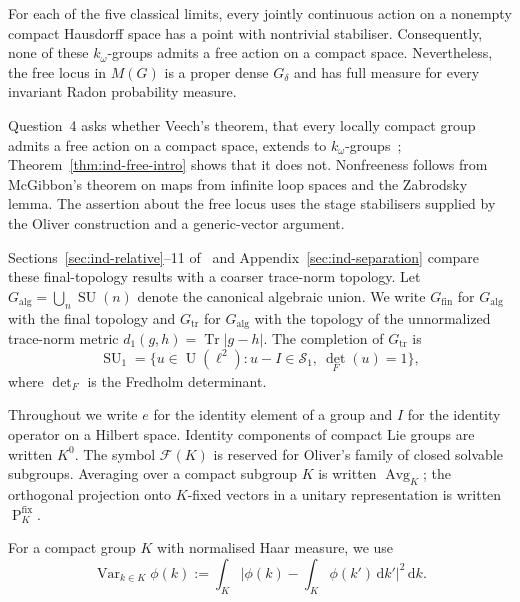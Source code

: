 \begin{theorem}\label{thm:ind-free-intro}
For each of the five classical limits, every jointly continuous action
on a nonempty compact Hausdorff space has a point with nontrivial
stabiliser. Consequently, none of these $k_\omega$-groups admits a free
action on a compact space. Nevertheless, the free locus in $M(G)$ is a
proper dense $G_\delta$ and has full measure for every invariant Radon
probability measure.
\end{theorem}

Question~4 asks whether Veech's theorem, that every locally compact
group admits a free action on a compact space, extends to
$k_\omega$-groups~\cite[p.~440]{Pestov2007};
Theorem~\ref{thm:ind-free-intro} shows that it does not.
Nonfreeness follows from McGibbon's theorem on maps from infinite
loop spaces and the Zabrodsky lemma. The assertion about the free
locus uses the stage stabilisers supplied by the Oliver construction
and a generic-vector argument.

Sections~\ref{sec:ind-relative}--11 of~\cite{LupiniInductive2026} and
Appendix~\ref{sec:ind-separation} compare these final-topology results with
a coarser trace-norm topology. Let
$G_{\mathrm{alg}}=\bigcup_n\operatorname{SU}(n)$ denote the canonical algebraic union. We write
$G_{\mathrm{fin}}$ for $G_{\mathrm{alg}}$ with the final topology and $G_{\mathrm{tr}}$ for
$G_{\mathrm{alg}}$ with the topology of the unnormalized trace-norm metric
$d_1(g,h)=\operatorname{Tr}\lvert g-h\rvert$. The completion of $G_{\mathrm{tr}}$ is
\begin{equation}\label{eq:ind-suone}
\operatorname{SU}_1=\{u\in\operatorname{U}(\ell^2):u-I\in\mathcal S_1,\ \det_F(u)=1\},
\end{equation}
where $\det_F$ is the Fredholm determinant.

Throughout we write $e$ for the identity element of a group and $I$ for
the identity operator on a Hilbert space. Identity components of compact
Lie groups are written $K^0$. The symbol $\mathcal F(K)$ is reserved for
Oliver's family of closed solvable subgroups. Averaging over a compact
subgroup $K$ is written $\operatorname{Avg}_K$; the orthogonal projection onto
$K$-fixed vectors in a unitary representation is written $\operatorname{P}^{\mathrm{fix}}_K$.

For a compact group $K$ with normalised Haar measure, we use
\begin{equation}\label{eq:ind-variance-convention}
\operatorname{Var}_{k\in K}\phi(k)
:=\int_K\lvert\phi(k)-\int_K\phi(k')\,\mathrm d k'\rvert^2\,\mathrm d k.
\end{equation}

